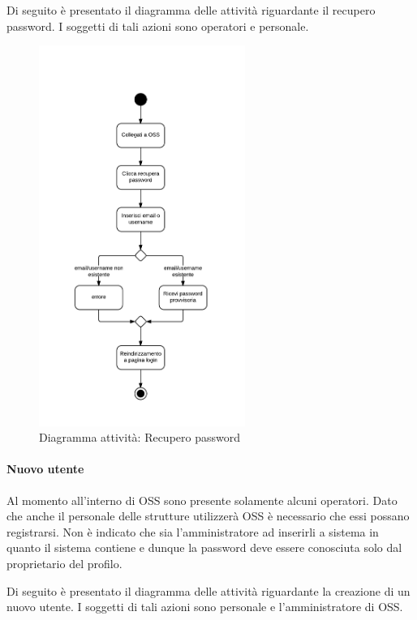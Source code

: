 Di seguito è presentato il diagramma delle attività riguardante il recupero password. I soggetti di tali azioni sono operatori e personale.\\


\begin{figure}[H]
\centering
\includegraphics[width=0.6\textwidth]{images/user_rcvpsw.png}
\caption{Diagramma attività: Recupero password}
\end{figure}


\paragraph{Nuovo utente}
Al momento all'interno di OSS sono presente solamente alcuni operatori. Dato che anche il personale delle strutture utilizzerà OSS è necessario che essi possano registrarsi. Non è indicato che sia l'amministratore ad inserirli a sistema in quanto il sistema contiene  e dunque la password deve essere conosciuta solo dal proprietario del profilo.

Di seguito è presentato il diagramma delle attività riguardante la creazione di un nuovo utente. I soggetti di tali azioni sono personale e l'amministratore di OSS.\\

